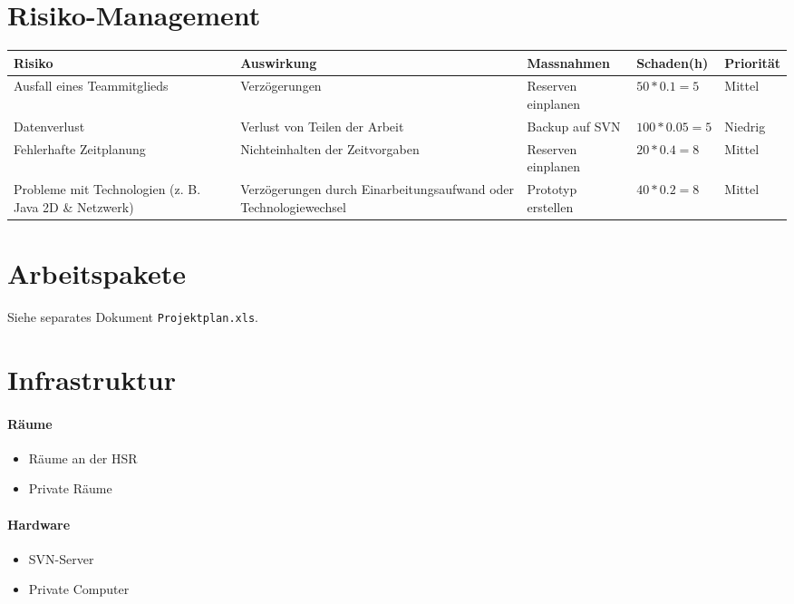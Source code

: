 \documentclass[12pt,halfparskip]{scrartcl}
\begin{document}
\section{Risiko-Management}
\label{risiko_management}

\begin{tabular}{@{} p{2.7cm} p{3.6cm} p{4cm} l l @{}}
\toprule
\textbf{Risiko} &
\textbf{Auswirkung} &
\textbf{Massnahmen} &
\textbf{Schaden\footnotemark (h)} &
\textbf{Priorität} \\
\midrule
Ausfall eines Teammitglieds & Verzögerungen & Reserven einplanen  & $50 * 0.1 = 5$ & Mittel \\
\midrule
Datenverlust & Verlust von Teilen der Arbeit & Backup auf SVN & $100 * 0.05 = 5$ & Niedrig \\
\midrule
Fehlerhafte Zeitplanung & Nichteinhalten der Zeitvorgaben & Reserven einplanen & $20 * 0.4 = 8$ & Mittel \\
\midrule
Probleme mit Technologien (z. B. Java 2D \&  Netzwerk) & Verzögerungen durch Einarbeitungsaufwand oder Technologiewechsel & Prototyp erstellen & $40 * 0.2 = 8$ & Mittel \\
\bottomrule
\end{tabular}


\section{Arbeitspakete}

Siehe separates Dokument \texttt{Projektplan.xls}.

\section{Infrastruktur}

\paragraph{Räume}
\begin{itemize}
	\item Räume an der HSR
	\item Private Räume
\end{itemize}

\paragraph{Hardware}
\begin{itemize}
	\item SVN-Server
	\item Private Computer
\end{itemize}
\end{document}
